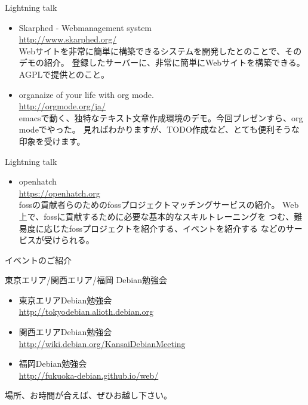 \begin{frame}{Lightning talk}
\begin{itemize}
\item Skarphed - Webmanagement system\\
\url{http://www.skarphed.org/}\\
Webサイトを非常に簡単に構築できるシステムを開発したとのことで、そのデモの紹介。  
登録したサーバーに、非常に簡単にWebサイトを構築できる。AGPLで提供とのこと。
\item organaize of your life with org mode.\\
\url{http://orgmode.org/ja/}\\
emacsで動く、独特なテキスト文章作成環境のデモ。今回プレゼンすら、org modeでやった。
見ればわかりますが、TODO作成など、とても便利そうな印象を受けます。
\end{itemize}

\end{frame}

\begin{frame}{Lightning talk}
\begin{itemize}
\item openhatch\\
\url{https://openhatch.org}\\
fossの貢献者らのためのfossプロジェクトマッチングサービスの紹介。
Web上で、fossに貢献するために必要な基本的なスキルトレーニングを
つむ、難易度に応じたfossプロジェクトを紹介する、イベントを紹介する
などのサービスが受けられる。
\end{itemize}
\end{frame}

\begin{frame}
\begin{center}
\LARGE{イベントのご紹介}
\end{center}
\end{frame}

\begin{frame}{東京エリア/関西エリア/福岡 Debian勉強会}

\begin{itemize}
\item 東京エリアDebian勉強会\\
\url{http://tokyodebian.alioth.debian.org}
\item 関西エリアDebian勉強会\\
\url{http://wiki.debian.org/KansaiDebianMeeting}
\item 福岡Debian勉強会\\
\url{http://fukuoka-debian.github.io/web/}
\end{itemize}

\begin{center}
\Large
場所、お時間が合えば、ぜひお越し下さい。
\end{center}

\end{frame}

